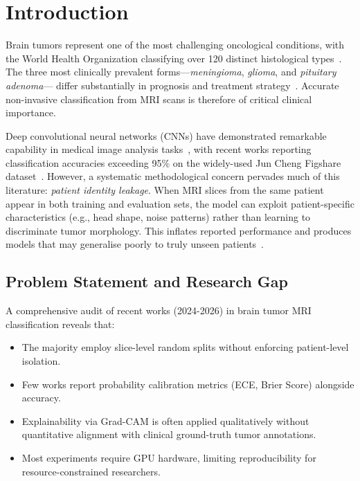 \documentclass[journal]{IEEEtran}
\begin{document}
\section{Introduction}
\label{sec:intro}

Brain tumors represent one of the most challenging oncological conditions, with the World Health
Organization classifying over 120 distinct histological types~\cite{who2021}. The three most
clinically prevalent forms—\textit{meningioma}, \textit{glioma}, and \textit{pituitary adenoma}—
differ substantially in prognosis and treatment strategy~\cite{louis2021who}. Accurate non-invasive
classification from MRI scans is therefore of critical clinical importance.

Deep convolutional neural networks (CNNs) have demonstrated remarkable capability in medical image
analysis tasks~\cite{litjens2017survey}, with recent works reporting classification accuracies
exceeding 95\% on the widely-used Jun Cheng Figshare dataset~\cite{cheng2015enhanced}.
However, a systematic methodological concern pervades much of this literature: \textit{patient
identity leakage}. When MRI slices from the same patient appear in both training and evaluation
sets, the model can exploit patient-specific characteristics (e.g., head shape, noise patterns)
rather than learning to discriminate tumor morphology. This inflates reported performance and
produces models that may generalise poorly to truly unseen patients~\cite{calderon2023patient}.

\subsection{Problem Statement and Research Gap}

A comprehensive audit of recent works (2024-2026) in brain tumor MRI classification reveals that:
\begin{itemize}
  \item The majority employ slice-level random splits without enforcing patient-level isolation.
  \item Few works report probability calibration metrics (ECE, Brier Score) alongside accuracy.
  \item Explainability via Grad-CAM is often applied qualitatively without quantitative alignment
        with clinical ground-truth tumor annotations.
  \item Most experiments require GPU hardware, limiting reproducibility for resource-constrained researchers.
\end{itemize}
\end{document}
